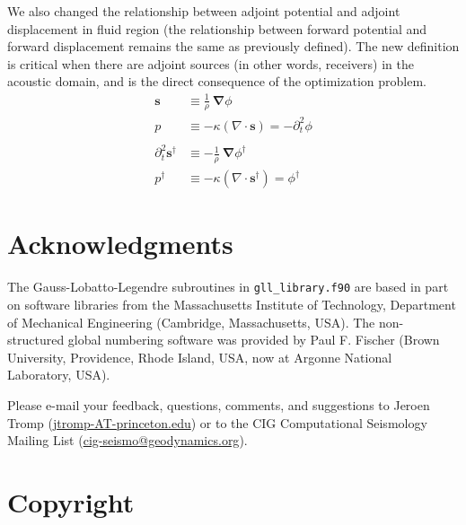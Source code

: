 \documentclass[oneside,english,onecolumn,letterpaper]{book}
\newcommand{\urlwithparentheses}[1]{(\url{#1})}
\begin{document}
We also changed the relationship between adjoint potential and adjoint displacement in fluid region
(the relationship between forward potential and forward displacement remains the same as previously defined).
The new definition is critical when there are adjoint sources (in other words, receivers) in the acoustic domain,
and is the direct consequence of the optimization problem.
%
\begin{align*}
\mathbf{s} &\equiv \frac{1}{\rho} \: \mathbf{\nabla}\phi \\
p &\equiv -\kappa\left(\nabla\cdot\mathbf{s}\right) = -\partial_t^2\phi \\
&\\
\partial_t^2\mathbf{s}^\dagger &\equiv -\frac{1}{\rho} \: \mathbf{\nabla}\phi^\dagger \\
p^\dagger &\equiv -\kappa\left(\nabla\cdot\mathbf{s}^\dagger\right) = \phi^\dagger
\end{align*}




\chapter*{Acknowledgments}


The Gauss-Lobatto-Legendre subroutines in \texttt{gll\_library.f90}
are based in part on software libraries from the Massachusetts Institute
of Technology, Department of Mechanical Engineering (Cambridge, Massachusetts, USA).
The non-structured global numbering software was provided by Paul
F. Fischer (Brown University, Providence, Rhode Island, USA, now at Argonne National Laboratory, USA).

Please e-mail your feedback, questions, comments, and suggestions
to Jeroen Tromp \urlwithparentheses{jtromp-AT-princeton.edu} or to the CIG Computational Seismology Mailing List \urlwithparentheses{cig-seismo@geodynamics.org}.



\chapter*{Copyright}
\end{document}
